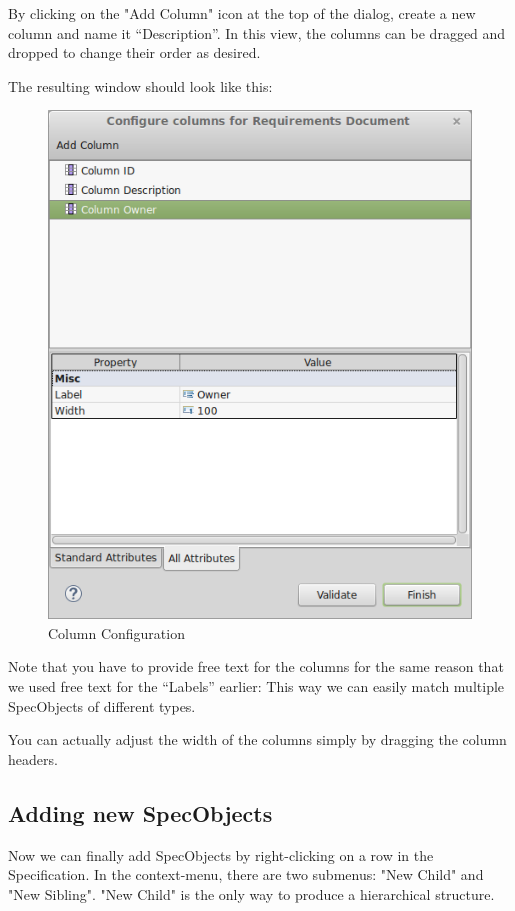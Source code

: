 By clicking on the "Add Column" icon at the top of the dialog, create a new column and name it ``Description''.  In this view, the columns can be dragged and dropped to change their order as desired.

The resulting window should look like this:

\begin{figure}[h!]
\centering      
\includegraphics[width=0.8\linewidth]{../rmf-images/columnconfig.png}      
\caption{Column Configuration}
\label{fig:column_configuration}
\end{figure}

Note that you have to provide free text for the columns for the same reason that we used free text for the ``Labels'' earlier: This way we can easily match multiple SpecObjects of different types.

You can actually adjust the width of the columns simply by dragging the column headers.

\subsection{Adding new SpecObjects}

Now we can finally add SpecObjects by right-clicking on a row in the Specification.  In the context-menu, there are two submenus: "New Child" and "New Sibling".  "New Child" is the only way to produce a hierarchical structure.

